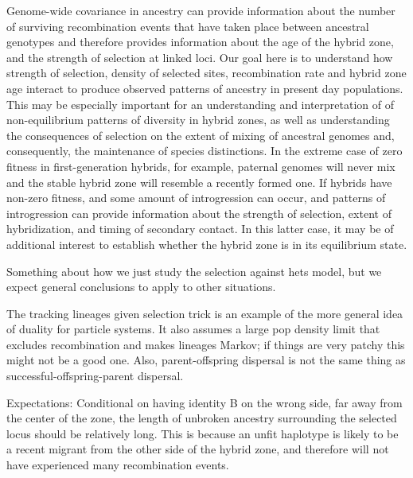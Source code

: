 \documentclass[12pt]{article}
\begin{document}
Genome-wide covariance in ancestry can provide information about the number of surviving recombination events that have taken place between ancestral genotypes and therefore provides information about the age of the hybrid zone, and the strength of selection at linked loci. Our goal here is  to understand how strength of selection, density of selected sites, recombination rate and hybrid zone age interact to produce observed patterns of ancestry in present day populations. This may be especially important for an understanding and interpretation of of non-equilibrium patterns of diversity in hybrid zones, as well as understanding the consequences of selection on the extent of mixing of ancestral genomes and, consequently, the maintenance of species distinctions. In the extreme case of zero fitness in first-generation hybrids, for example, paternal genomes will never mix and the stable hybrid zone will resemble a recently formed one. If hybrids have non-zero fitness, and some amount of introgression can occur, and patterns of introgression can provide information about the strength of selection, extent of hybridization, and timing of secondary contact. In this latter case, it may be of additional interest to establish whether the hybrid zone is in its equilibrium state. 

Something about how we just study the selection against hets model,
but we expect general conclusions to apply to other situations.

The tracking lineages given selection trick is an example of the more general idea of duality for particle systems.
It also assumes a large pop density limit that excludes recombination and makes lineages Markov;
if things are very patchy this might not be a good one.
Also, parent-offspring dispersal is not the same thing as successful-offspring-parent dispersal.

Expectations:
Conditional  on having identity B on the wrong side, far away from the center of the zone, the length of unbroken ancestry surrounding the selected locus should be relatively long. This is because an unfit haplotype is likely to be a recent migrant from the other side of the hybrid zone, and therefore will not have experienced many recombination events. 


\end{document}
